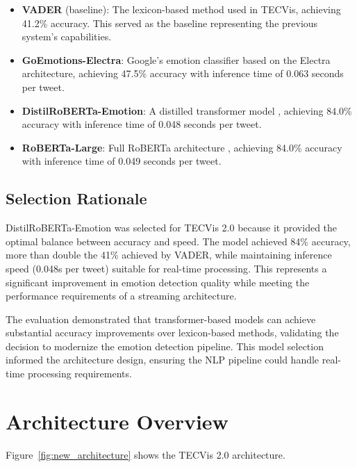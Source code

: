\begin{itemize}
\item \textbf{VADER} (baseline): The lexicon-based method used in TECVis, achieving 41.2\% accuracy. This served as the baseline representing the previous system's capabilities.

\item \textbf{GoEmotions-Electra}: Google's emotion classifier based on the Electra architecture, achieving 47.5\% accuracy with inference time of 0.063 seconds per tweet.

\item \textbf{DistilRoBERTa-Emotion}: A distilled transformer model \cite{hartmann2023emotion}, achieving 84.0\% accuracy with inference time of 0.048 seconds per tweet.

\item \textbf{RoBERTa-Large}: Full RoBERTa architecture \cite{liu2019roberta}, achieving 84.0\% accuracy with inference time of 0.049 seconds per tweet.
\end{itemize}

\subsection{Selection Rationale}

DistilRoBERTa-Emotion was selected for TECVis 2.0 because it provided the optimal balance between accuracy and speed. The model achieved 84\% accuracy, more than double the 41\% achieved by VADER, while maintaining inference speed (0.048s per tweet) suitable for real-time processing. This represents a significant improvement in emotion detection quality while meeting the performance requirements of a streaming architecture.

The evaluation demonstrated that transformer-based models can achieve substantial accuracy improvements over lexicon-based methods, validating the decision to modernize the emotion detection pipeline. This model selection informed the architecture design, ensuring the NLP pipeline could handle real-time processing requirements.


\newpage
\section{Architecture Overview}

Figure~\ref{fig:new_architecture} shows the TECVis 2.0 architecture.

